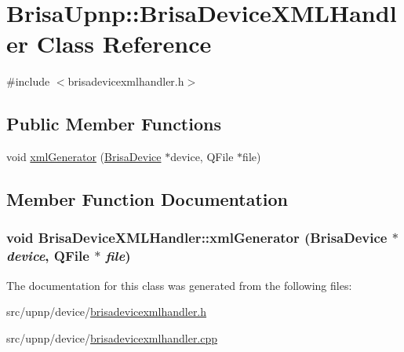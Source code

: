\hypertarget{classBrisaUpnp_1_1BrisaDeviceXMLHandler}{
\section{BrisaUpnp::BrisaDeviceXMLHandler Class Reference}
\label{classBrisaUpnp_1_1BrisaDeviceXMLHandler}
}


{\ttfamily \#include $<$brisadevicexmlhandler.h$>$}\subsection*{Public Member Functions}
\begin{DoxyCompactItemize}
\item 
void \hyperlink{classBrisaUpnp_1_1BrisaDeviceXMLHandler_a43668d253e643ae53d2edd4c4aa29a24}{xmlGenerator} (\hyperlink{classBrisaUpnp_1_1BrisaDevice}{BrisaDevice} $\ast$device, QFile $\ast$file)
\end{DoxyCompactItemize}


\subsection{Member Function Documentation}
\hypertarget{classBrisaUpnp_1_1BrisaDeviceXMLHandler_a43668d253e643ae53d2edd4c4aa29a24}{
\subsubsection[{xmlGenerator}]{\setlength{\rightskip}{0pt plus 5cm}void BrisaDeviceXMLHandler::xmlGenerator ({\bf BrisaDevice} $\ast$ {\em device}, \/  QFile $\ast$ {\em file})}}
\label{classBrisaUpnp_1_1BrisaDeviceXMLHandler_a43668d253e643ae53d2edd4c4aa29a24}


The documentation for this class was generated from the following files:\begin{DoxyCompactItemize}
\item 
src/upnp/device/\hyperlink{brisadevicexmlhandler_8h}{brisadevicexmlhandler.h}\item 
src/upnp/device/\hyperlink{brisadevicexmlhandler_8cpp}{brisadevicexmlhandler.cpp}\end{DoxyCompactItemize}
